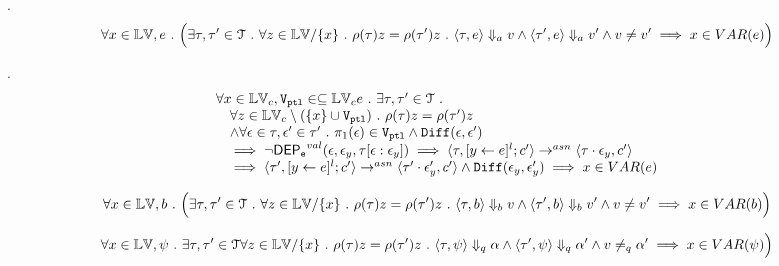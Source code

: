\begin{lem}.
\label{lem:inv_a}
\[
	\forall x \in \mathbb{LV}, e ~.~ 
	\Big( \exists \mathtt{\tau}, \mathtt{\tau}' \in \mathcal{T} ~.~ \forall z \in \mathbb{LV} / \{x\} ~.~ 
	\rho(\mathtt{\tau}) z = \rho(\mathtt{\tau}') z ~.~ 
	\langle \mathtt{\tau}, e \rangle \Downarrow_a v \land \langle \mathtt{\tau}', e \rangle \Downarrow_a v' \land v \neq v'
	\implies x \in VAR(e)\Big)
\]
\end{lem}
%
\begin{lem}.
\label{lem:inv_eval_asn}
\[
\begin{array}{l}
	\forall x \in \mathbb{LV}_c, \mathtt{V_{ptl}} \in \subseteq \mathbb{LV}_c e ~.~ 
	\exists \mathtt{\tau}, \mathtt{\tau}' \in \mathcal{T} ~.~ 
	\\ \quad
	\forall z \in \mathbb{LV}_c \setminus (\{x\} \cup \mathtt{V_{ptl}}) ~.~ 
	\rho(\mathtt{\tau}) z = \rho(\mathtt{\tau}') z 
	\\ \quad \land
	\forall \mathtt{\epsilon} \in \mathtt{\tau}, \mathtt{\epsilon}' \in \mathtt{\tau}' ~.~ 
	\pi_1(\mathtt{\epsilon}) \in \mathtt{V_{ptl}} \land \mathtt{Diff}(\mathtt{\epsilon}, \mathtt{\epsilon}') 
	\\ \quad
	\implies 
	\neg \mathsf{DEP_{\mathtt{e}}}^{val}(\mathtt{\epsilon}, \mathtt{\epsilon}_y, \mathtt{\tau}[\mathtt{\epsilon}:\mathtt{\epsilon}_y] ) 
	\implies
	\langle \mathtt{\tau}, [\mathrel{ y \leftarrow e }]{}^l;c' \rangle \rightarrow^{asn} \langle \mathtt{\tau}\cdot \mathtt{\epsilon}_y, c' \rangle
	\\ \quad
	\implies 
	\langle \mathtt{\tau}', [\mathrel{ y \leftarrow e }]{}^l;c' \rangle \rightarrow^{asn} \langle \mathtt{\tau}'\cdot \mathtt{\epsilon}_y',c' \rangle
	\land \mathtt{Diff}(\mathtt{\epsilon}_y, \mathtt{\epsilon}_y')
	\implies x \in VAR(e)
\end{array}
\]
\end{lem}
%
\begin{lem}
\label{lem:inv_b}
\[
	\forall x \in \mathbb{LV}, b ~.~ 
	\Big( \exists \mathtt{\tau}, \mathtt{\tau}' \in \mathcal{T} ~.~ \forall z \in \mathbb{LV} / \{x\} ~.~
	\rho(\mathtt{\tau}) z = \rho(\mathtt{\tau}') z ~.~ 
	\langle \mathtt{\tau}, b \rangle \Downarrow_b v \land \langle \mathtt{\tau}', b \rangle \Downarrow_b v' \land v \neq v'
	\implies x \in VAR(b) \Big)
\]
\end{lem}
%
\begin{lem}
\label{lem:inv_q}
\[
	\forall x \in \mathbb{LV}, \psi ~.~ \exists \mathtt{\tau}, \mathtt{\tau}' \in \mathcal{T} \forall z \in \mathbb{LV} / \{x\} ~.~
	\rho(\mathtt{\tau}) z = \rho(\mathtt{\tau}') z ~.~ 
	\langle \mathtt{\tau}, \psi \rangle \Downarrow_q \alpha \land \langle \mathtt{\tau}', \psi \rangle \Downarrow_q \alpha' 
	\land v \neq_{q} \alpha'
	\implies x \in VAR(\psi) \Big)
\]
\end{lem}
%
